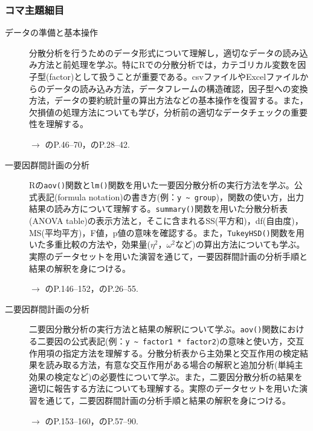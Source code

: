 \subsubsection{コマ主題細目}
\begin{description}
	\item[データの準備と基本操作] 分散分析を行うためのデータ形式について理解し，適切なデータの読み込み方法と前処理を学ぶ。特にRでの分散分析では，カテゴリカル変数を因子型(factor)として扱うことが重要である。csvファイルやExcelファイルからのデータの読み込み方法，データフレームの構造確認，因子型への変換方法，データの要約統計量の算出方法などの基本操作を復習する。また，欠損値の処理方法についても学び，分析前の適切なデータチェックの重要性を理解する。
	      \begin{flushright}
		      $\to$ \textcite{kosugi2019}のP.46--70，\textcite{Kinosady2021}のP.28--42.
	      \end{flushright}

	\item[一要因群間計画の分析] Rの\verb|aov()|関数と\verb|lm()|関数を用いた一要因分散分析の実行方法を学ぶ。公式表記(formula notation)の書き方(例：\verb|y ~ group|)，関数の使い方，出力結果の読み方について理解する。\verb|summary()|関数を用いた分散分析表(ANOVA table)の表示方法と，そこに含まれるSS(平方和)，df(自由度)，MS(平均平方)，F値，p値の意味を確認する。また，\verb|TukeyHSD()|関数を用いた多重比較の方法や，効果量($\eta^2$，$\omega^2$など)の算出方法についても学ぶ。実際のデータセットを用いた演習を通じて，一要因群間計画の分析手順と結果の解釈を身につける。
	      \begin{flushright}
		      $\to$ \textcite{kosugi2019}のP.146--152，\textcite{Hashimoto201607}のP.26--55.
	      \end{flushright}

	\item[二要因群間計画の分析] 二要因分散分析の実行方法と結果の解釈について学ぶ。\verb|aov()|関数における二要因の公式表記(例：\verb|y ~ factor1 * factor2|)の意味と使い方，交互作用項の指定方法を理解する。分散分析表から主効果と交互作用の検定結果を読み取る方法，有意な交互作用がある場合の解釈と追加分析(単純主効果の検定など)の必要性について学ぶ。また，二要因分散分析の結果を適切に報告する方法についても理解する。実際のデータセットを用いた演習を通じて，二要因群間計画の分析手順と結果の解釈を身につける。
	      \begin{flushright}
		      $\to$ \textcite{kosugi2019}のP.153--160，\textcite{Hashimoto201607}のP.57--90.
	      \end{flushright}


\end{description}
